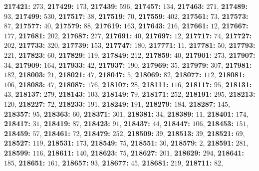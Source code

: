 \textsf{\bfseries 217421:} $273$, \textsf{\bfseries 217429:} $173$, \textsf{\bfseries 217439:} $596$, \textsf{\bfseries 217457:} $134$, \textsf{\bfseries 217463:} $271$, \textsf{\bfseries 217489:} $93$, \textsf{\bfseries 217499:} $530$, \textsf{\bfseries 217517:} $38$, \textsf{\bfseries 217519:} $70$, \textsf{\bfseries 217559:} $402$, \textsf{\bfseries 217561:} $73$, \textsf{\bfseries 217573:} $87$, \textsf{\bfseries 217577:} $40$, \textsf{\bfseries 217579:} $88$, \textsf{\bfseries 217619:} $163$, \textsf{\bfseries 217643:} $216$, \textsf{\bfseries 217661:} $12$, \textsf{\bfseries 217667:} $177$, \textsf{\bfseries 217681:} $202$, \textsf{\bfseries 217687:} $277$, \textsf{\bfseries 217691:} $40$, \textsf{\bfseries 217697:} $12$, \textsf{\bfseries 217717:} $74$, \textsf{\bfseries 217727:} $202$, \textsf{\bfseries 217733:} $320$, \textsf{\bfseries 217739:} $153$, \textsf{\bfseries 217747:} $180$, \textsf{\bfseries 217771:} $11$, \textsf{\bfseries 217781:} $50$, \textsf{\bfseries 217793:} $221$, \textsf{\bfseries 217823:} $60$, \textsf{\bfseries 217829:} $119$, \textsf{\bfseries 217849:} $212$, \textsf{\bfseries 217859:} $40$, \textsf{\bfseries 217901:} $273$, \textsf{\bfseries 217907:} $34$, \textsf{\bfseries 217909:} $164$, \textsf{\bfseries 217933:} $42$, \textsf{\bfseries 217937:} $190$, \textsf{\bfseries 217969:} $35$, \textsf{\bfseries 217979:} $307$, \textsf{\bfseries 217981:} $182$, \textsf{\bfseries 218003:} $21$, \textsf{\bfseries 218021:} $47$, \textsf{\bfseries 218047:} $5$, \textsf{\bfseries 218069:} $82$, \textsf{\bfseries 218077:} $112$, \textsf{\bfseries 218081:} $106$, \textsf{\bfseries 218083:} $47$, \textsf{\bfseries 218087:} $176$, \textsf{\bfseries 218107:} $28$, \textsf{\bfseries 218111:} $116$, \textsf{\bfseries 218117:} $95$, \textsf{\bfseries 218131:} $43$, \textsf{\bfseries 218137:} $279$, \textsf{\bfseries 218143:} $103$, \textsf{\bfseries 218149:} $79$, \textsf{\bfseries 218171:} $252$, \textsf{\bfseries 218191:} $295$, \textsf{\bfseries 218213:} $120$, \textsf{\bfseries 218227:} $72$, \textsf{\bfseries 218233:} $191$, \textsf{\bfseries 218249:} $191$, \textsf{\bfseries 218279:} $184$, \textsf{\bfseries 218287:} $145$, \textsf{\bfseries 218357:} $95$, \textsf{\bfseries 218363:} $60$, \textsf{\bfseries 218371:} $301$, \textsf{\bfseries 218381:} $34$, \textsf{\bfseries 218389:} $11$, \textsf{\bfseries 218401:} $174$, \textsf{\bfseries 218417:} $31$, \textsf{\bfseries 218419:} $87$, \textsf{\bfseries 218423:} $91$, \textsf{\bfseries 218437:} $44$, \textsf{\bfseries 218447:} $106$, \textsf{\bfseries 218453:} $151$, \textsf{\bfseries 218459:} $57$, \textsf{\bfseries 218461:} $72$, \textsf{\bfseries 218479:} $252$, \textsf{\bfseries 218509:} $39$, \textsf{\bfseries 218513:} $39$, \textsf{\bfseries 218521:} $69$, \textsf{\bfseries 218527:} $119$, \textsf{\bfseries 218531:} $173$, \textsf{\bfseries 218549:} $75$, \textsf{\bfseries 218551:} $30$, \textsf{\bfseries 218579:} $2$, \textsf{\bfseries 218591:} $281$, \textsf{\bfseries 218599:} $116$, \textsf{\bfseries 218611:} $140$, \textsf{\bfseries 218623:} $75$, \textsf{\bfseries 218627:} $201$, \textsf{\bfseries 218629:} $294$, \textsf{\bfseries 218641:} $185$, \textsf{\bfseries 218651:} $161$, \textsf{\bfseries 218657:} $93$, \textsf{\bfseries 218677:} $45$, \textsf{\bfseries 218681:} $219$, \textsf{\bfseries 218711:} $82$, 
